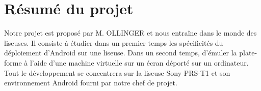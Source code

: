 \chapter{Résumé du projet}

Notre projet est proposé par M. OLLINGER et nous entraîne dans le monde des liseuses. Il consiste à étudier dans un premier temps les spécificités du déploiement d'Android sur une liseuse. Dans un second temps, d'émuler la plate-forme à l'aide d'une machine virtuelle sur un écran déporté sur un ordinateur. Tout le développement se concentrera sur la liseuse Sony PRS-T1 et son environnement Android fourni par notre chef de projet. 


